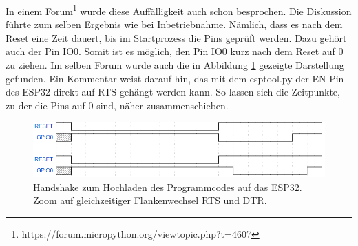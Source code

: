 \begin{enumerate}
\begin{enumerate}
\newpage

In einem Forum\footnote{https://forum.micropython.org/viewtopic.php?t=4607} wurde diese Auffälligkeit auch schon besprochen. Die Diskussion führte zum selben Ergebnis wie bei Inbetriebnahme. Nämlich, dass es nach dem Reset eine Zeit dauert, bis im Startprozess die Pins geprüft werden. Dazu gehört auch der Pin IO0. Somit ist es möglich, den Pin IO0 kurz nach dem Reset auf 0 zu ziehen.
Im selben Forum wurde auch die in Abbildung \ref{fig:ESP32_Handshake_Forum} gezeigte Darstellung gefunden. Ein Kommentar weist darauf hin, das mit dem esptool.py der EN-Pin des ESP32 direkt auf RTS gehängt werden kann. So lassen sich die Zeitpunkte, zu der die Pins auf 0 sind, näher zusammenschieben.

\begin{figure}[h!]
\center
\includegraphics[width = \textwidth]{graphics/ESP32_Handshake_Forum}
\caption{Handshake zum Hochladen des Programmcodes auf das ESP32. Zoom auf gleichzeitiger Flankenwechsel RTS und DTR.}
\label{fig:ESP32_Handshake_Forum}
\end{figure}


\end{enumerate}
\end{enumerate}
